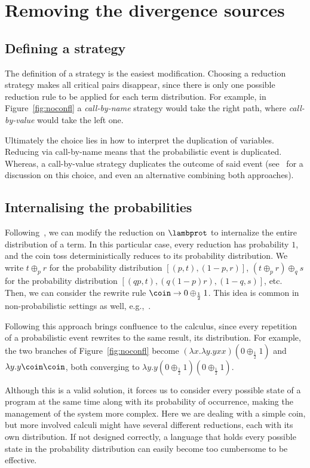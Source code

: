 \section{Removing the divergence sources}
\subsection{Defining a strategy}\label{sec:strategy}
The definition of a strategy is the easiest modification. Choosing a reduction strategy makes all critical pairs disappear, since there is only one possible reduction rule to be applied for each term distribution. For example, in Figure~\ref{fig:noconfl} a \textit{call-by-name} strategy would take the right path, where \textit{call-by-value} would take the left one. 

Ultimately the choice lies in how to interpret the duplication of variables. Reducing via call-by-name means that the probabilistic event is duplicated. Whereas, a call-by-value strategy duplicates the outcome of said event (see~\cite{Dallago} for a discussion on this choice, and even an alternative combining both approaches).

\subsection{Internalising the probabilities}\label{sec:circulito}
Following~\cite{lambdarho}, we can modify the reduction on $\lambprot$ to internalize the entire distribution of a term. In this particular case, every reduction has probability $1$, and the coin toss deterministically reduces to its probability distribution.
We write $t\oplus_{p}r$ for the probability distribution $[(p,t),(1-p,r)]$, $(t\oplus_p r)\oplus_q s$ for the probability distribution $[(qp,t),(q(1-p)r),(1-q,s)]$, etc. Then, we can consider the rewrite rule
\(
  \coin\to 0 \oplus_{\frac 12} 1
\).
This idea is common in non-probabilistic settings as well, e.g.,~\cite{AlvesDunduaFloridoKutsiaIGPL18}.

Following this approach brings confluence to the calculus, since every repetition of a probabilistic event rewrites to the same result, its distribution. For example, the two branches of Figure~\ref{fig:noconfl} become $(\lambda x.\lambda y.yxx)(0\oplus_{\frac 12}1)$ and $\lambda y.y\coin\coin$, both converging to $\lambda y.y(0\oplus_{\frac 12}1)(0\oplus_{\frac 12}1)$.

Although this is a valid solution, it forces us to consider every possible state of a program at the same time along with its probability of occurrence, making the management of the system more complex. Here we are dealing with a simple coin, but more involved calculi might have several different reductions, each with its own distribution. If not designed correctly, a language that holds every possible state in the probability distribution can easily become too cumbersome to be effective.


